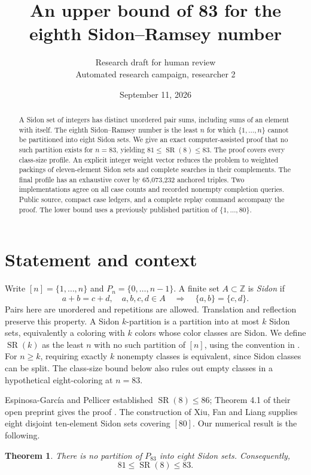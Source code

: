 \documentclass[11pt]{article}
\title{An upper bound of 83 for the eighth Sidon--Ramsey number}
\author{Research draft for human review\\\small Automated research campaign, researcher 2}
\date{September 11, 2026}
\newtheorem{theorem}{Theorem}
\newcommand{\SR}{\operatorname{SR}}
\begin{document}
\maketitle
\begin{abstract}
A Sidon set of integers has distinct unordered pair sums, including sums
of an element with itself. The eighth Sidon--Ramsey number is the least
$n$ for which $\{1,\ldots,n\}$ cannot be partitioned into eight Sidon sets.
We give an exact computer-assisted proof that no such partition exists
for $n=83$, yielding $81\leq\SR(8)\leq83$. The proof covers every class-size
profile. An explicit integer weight vector reduces the problem to
weighted packings of eleven-element Sidon sets and complete searches in
their complements. The final profile has an exhaustive cover by
65,073,232 anchored triples. Two implementations agree on all case counts
and recorded nonempty completion queries. Public source, compact case
ledgers, and a complete replay command accompany the proof. The lower
bound uses a previously published partition of $\{1,\ldots,80\}$.
\end{abstract}

\section{Statement and context}
Write $[n]=\{1,\ldots,n\}$ and $P_n=\{0,\ldots,n-1\}$. A finite set
$A\subset\mathbb Z$ is \emph{Sidon} if
\[
 a+b=c+d,\quad a,b,c,d\in A
 \quad\Longrightarrow\quad \{a,b\}=\{c,d\}.
\]
Pairs here are unordered and repetitions are allowed. Translation and
reflection preserve this property. A Sidon $k$-partition is a partition
into at most $k$ Sidon sets, equivalently a coloring with $k$ colors whose
color classes are Sidon. We define $\SR(k)$ as the least $n$ with no such
partition of $[n]$, using the convention in \cite{EGMRS,EP}. For $n\geq k$,
requiring exactly $k$ nonempty classes is equivalent, since Sidon classes
can be split. The class-size bound below also rules out empty classes in
a hypothetical eight-coloring at $n=83$.

Espinosa-Garc\'ia and Pellicer established $\SR(8)\leq86$;
Theorem 4.1 of their open preprint gives the proof \cite{EP}. The
construction of Xiu, Fan and Liang \cite[Table I, $I=8$]{XFL} supplies
eight disjoint ten-element Sidon sets covering $[80]$. Our numerical
result is the following.

\begin{theorem}\label{thm:main}
There is no partition of $P_{83}$ into eight Sidon sets. Consequently,
\[
                         81\leq\SR(8)\leq83.
\]
\end{theorem}
\end{document}
